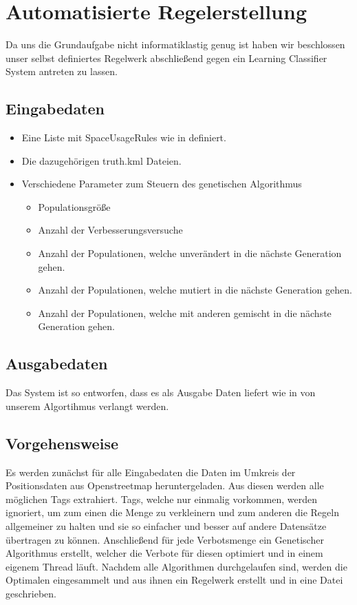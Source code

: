 \section{Automatisierte Regelerstellung}
Da uns die Grundaufgabe nicht informatiklastig genug ist
haben wir beschlossen unser selbst definiertes Regelwerk abschließend gegen ein Learning Classifier System antreten zu lassen.

\subsection{Eingabedaten}
\begin{itemize}
\item Eine Liste mit SpaceUsageRules wie in  definiert.
\item Die dazugehörigen truth.kml Dateien.
\item Verschiedene Parameter zum Steuern des genetischen Algorithmus
  \begin{itemize}
  \item Populationsgröße
  \item Anzahl der Verbesserungsversuche
  \item Anzahl der Populationen, welche unverändert in die nächste Generation gehen.
  \item Anzahl der Populationen, welche mutiert in die nächste Generation gehen.
  \item Anzahl der Populationen, welche mit anderen gemischt in die nächste Generation gehen.
  \end{itemize}
\end{itemize}

\subsection{Ausgabedaten}
Das System ist so entworfen, dass es als Ausgabe Daten liefert wie in  von unserem Algortihmus verlangt werden.

\subsection{Vorgehensweise}
Es werden zunächst für alle Eingabedaten die Daten im Umkreis der Positionsdaten aus Openstreetmap heruntergeladen.
Aus diesen werden alle möglichen Tags extrahiert. Tags, welche nur einmalig vorkommen, werden ignoriert, um zum einen die Menge zu verkleinern
und zum anderen die Regeln allgemeiner zu halten und sie so einfacher und besser auf andere Datensätze übertragen zu können.
Anschließend für jede Verbotsmenge ein Genetischer Algorithmus erstellt, welcher die Verbote für diesen optimiert und in einem eigenem Thread läuft.
Nachdem alle Algorithmen durchgelaufen sind, werden die Optimalen eingesammelt und aus ihnen ein Regelwerk erstellt und in eine Datei geschrieben.

